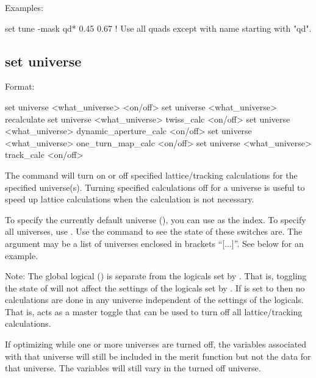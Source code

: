 {{{{{Examples:
\begin{example}
  set tune -mask qd* 0.45 0.67  ! Use all quads except with name starting with "qd".
\end{example}


\subsection{set universe}
\label{s:set.universe}

Format:
\begin{example}
  set universe <what_universe> <on/off>
  set universe <what_universe> recalculate
  set universe <what_universe> twiss_calc <on/off>
  set universe <what_universe> dynamic_aperture_calc <on/off>
  set universe <what_universe> one_turn_map_calc <on/off>
  set universe <what_universe> track_calc <on/off>
\end{example}

The  command will turn on or off specified lattice/tracking
calculations for the specified universe(s). Turning specified calculations off for a universe is
useful to speed up lattice calculations when the calculation is not necessary. 

To specify the currently default universe (), you can use  as the
 index. To specify all universes, use \vn{*}. Use the  command
to see the state of these switches are. The  argument may be a list of universes
enclosed in brackets ``[...]''. See below for an example.

Note: The global logical  () is separate from the logicals set
by . That is, toggling the state of  will not affect the
settings of the logicals set by . If  is set to  then
no calculations are done in any universe independent of the settings of the 
logicals. That is,  acts as a master toggle that can be used to turn off all
lattice/tracking calculations.

If optimizing while one or more universes are turned off, the variables associated with that
universe will still be included in the merit function but not the data for that universe. The
variables will still vary in the turned off universe.

}}}}}
